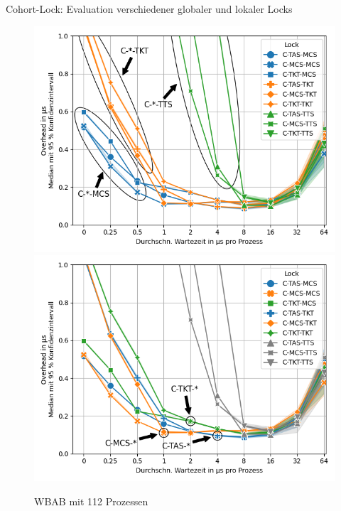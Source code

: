 \documentclass[fleqn,compress,utf8,aspectratio=169,t]{beamer}
\begin{document}
\begin{frame}{Cohort-Lock: Evaluation verschiedener globaler und lokaler Locks}
\begin{minipage}{.47\textwidth}
\begin{figure}
\begin{overprint}
                \includegraphics[width=\textwidth]{cohort-WBAB-112-overhead-low-contention}
                \includegraphics[width=\textwidth]{cohort-WBAB-112-overhead-medium-contention}
            \end{overprint}
            \caption{WBAB mit 112 Prozessen}
        \end{figure}
    \end{minipage}
\end{frame}
\end{document}
